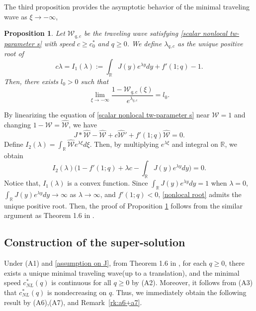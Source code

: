 \documentclass[11pt,a4paper]{article}
\newtheorem{proposition}[theorem]{\textbf{Proposition}}
\numberwithin{equation}{section}
\numberwithin{figure}{section}
\begin{document}
The third proposition provides the asymptotic behavior of the minimal traveling wave as $\xi\to-\infty$,
\begin{proposition}\label{prop: asy tw - infty nonlocal}
Let $\mathcal{W}_{q,c}$ be the traveling wave satisfying \eqref{scalar nonlocal tw-parameter s} with speed $c\ge c^*_0$ and $q\ge 0$.
We define $\lambda_{q,c}$ as the unique positive root of
\begin{equation}\label{nonlocal root}
c\lambda=I_1(\lambda):=\int_{\mathbb{R}}J(y)e^{\lambda y}dy+f'(1;q)-1.
\end{equation}
Then, there exists $l_0>0$ such that
\begin{equation}\label{asy of nonlocal tw - infty}
\lim_{\xi\to-\infty}\frac{1-\mathcal{W}_{q,c}(\xi)}{e^{\lambda_{q,c}}}=l_0.
\end{equation}
\end{proposition}
By linearizing the equation of \eqref{scalar nonlocal tw-parameter s} near $\mathcal{W}=1$ and changing $1-\mathcal{W}=\hat{\mathcal{W}}$, we have
$$J\ast\hat{\mathcal{W}}-\hat{\mathcal{W}}+c\hat{\mathcal{W}}'+f'(1;q)\hat{\mathcal{W}}=0.$$
Define
$I_2(\lambda)=\int_{\mathbb{R}}\hat{\mathcal{W}}e^{\lambda\xi}d\xi.$
Then, by multiplying $e^{\lambda \xi}$ and integral on $\mathbb{R}$, we obtain
$$I_2(\lambda)\Big(1-f'(1;q)+\lambda c-\int_{\mathbb{R}}J(y)e^{\lambda y}dy\Big)=0.$$
Notice that, $I_1(\lambda)$ is a convex function.
Since $\int_{\mathbb{R}}J(y)e^{\lambda y}dy=1$ when $\lambda=0$, $\int_{\mathbb{R}}J(y)e^{\lambda y}dy\to \infty$ as $\lambda\to\infty$, and $f'(1;q)<0$, \eqref{nonlocal root} admits the unique positive root. Then, the proof of Proposition \ref{prop: asy tw - infty nonlocal} follows from the similar argument as Theorem 1.6 in \cite{Coville}.



\subsection{Construction of the super-solution}\label{subsec-3-1}

\noindent

Under (A1) and \eqref{assumption on J}, from Theorem 1.6 in \cite{Coville}, for each $q\geq0$, there exists a unique minimal traveling wave(up to a translation), and the minimal speed $c_{NL}^*(q)$ is continuous for all $q\ge 0$ by (A2).
Moreover, it follows from (A3) that $c_{NL}^*(q)$ is nondecreasing on $q$. Thus, we immediately obtain the following result by (A6),(A7), and Remark~\ref{rk:a6+a7}.
\end{document}
